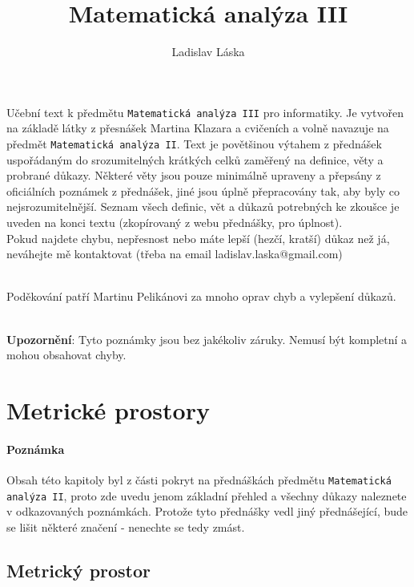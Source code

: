 \documentclass[a4paper,10pt]{article}
\title{Matematická analýza III}
\author{Ladislav Láska}
\begin{document}
\maketitle
Učební text k předmětu \texttt{Matematická analýza III} pro informatiky. Je
vytvořen na základě látky z přesnášek Martina Klazara a cvičeních a volně navazuje na předmět
\texttt{Matematická analýza II}. Text je povětšinou výtahem z
přednášek uspořádaným do srozumitelných krátkých celků zaměřený na definice,
věty a probrané důkazy. Některé věty jsou pouze minimálně upraveny a přepsány z
oficiálních poznámek z přednášek, jiné jsou úplně přepracovány tak, aby byly co
nejsrozumitelnější. Seznam všech definic, vět a důkazů potrebných ke 
zkoušce je uveden na konci textu
(zkopírovaný z webu přednášky, pro úplnost). \\

Pokud najdete chybu, nepřesnost nebo máte lepší (hezčí, kratší) důkaz než já, neváhejte mě kontaktovat (třeba na email ladislav.laska@gmail.com)

\ \\

Poděkování patří Martinu Pelikánovi za mnoho oprav chyb a vylepšení důkazů.

\ \\

\textbf{Upozornění}: Tyto poznámky jsou bez jakékoliv záruky. Nemusí být kompletní a mohou
obsahovat chyby.
\newpage
\newpage


\tableofcontents
\newpage

\section{Metrické prostory}
\paragraph{Poznámka}
Obsah této kapitoly byl z části pokryt na přednáškách předmětu
\texttt{Matematická analýza II}, proto zde uvedu jenom základní přehled a
všechny důkazy naleznete v odkazovaných poznámkách. Protože tyto přednášky vedl
jiný přednášející, bude se lišit některé značení - nenechte se tedy zmást.

\subsection{Metrický prostor}
\setcounter{equation}{0}
\end{document}

